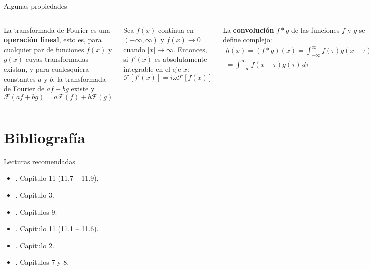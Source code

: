\documentclass[9pt, aspectratio=169]{beamer}
\begin{document}
\begin{frame}{Algunas propiedades}
\begin{columns}[c]
\cx
\begin{theorem}
    La transformada de Fourier es una \textbf{operación lineal}, esto es, para cualquier par de funciones $f(x)$ y $g(x)$ cuyas transformadas existan, y para cualesquiera constantes $a$ y $b$, la transformada de Fourier de $af + bg$ existe y
\begin{equation*}
    \mathscr{F}(a f + b g) = a \mathscr{F}(f) +  b \mathscr{F}(g)
\end{equation*}
\end{theorem} \pause

\begin{theorem}
Sea $f(x)$ continua en $(-\infty, \infty)$ y $f(x) \rightarrow 0$ cuando $|x| \rightarrow \infty$. Entonces, si $f'(x)$ es absolutamente integrable en el eje $x$:
\[ \mathscr{F}[ f'(x)] = i \omega \mathscr{F}[f(x)]  \]
\end{theorem}
\pause 

\cx
La \textbf{convolución} $f * g$ de las funciones $f$ y $g$ se define complejo:
\begin{multline*}
    h(x) = (f * g)(x) = \int_{-\infty}^{\infty} f(\tau) g(x - \tau) \, d\tau \\
= \int_{-\infty}^{\infty} f(x - \tau) g(\tau) \, d\tau 
\end{multline*}
\pause 

\begin{theorem}[Convolución]
Sean $f(x)$ y $g(x)$ funciones acotadas, continuas por tramos, y absolutamente integrables en $(-\infty, \infty)$, entonces
\[ \mathscr{F}(f * g) = \sqrt{2 \pi} \mathscr{F}(f) \mathscr{F}(g) \]
\end{theorem}

\end{columns}
\end{frame}


\section*{Bibliografía}
\begin{frame}{Lecturas recomendadas}
\begin{itemize}
 \item {}. Capítulo 11 (11.7 -- 11.9).
 \item {}. Capítulo 3.
 \item {}. Capítulos 9.
 \item {}. Capítulo 11 (11.1 -- 11.6).
 \item {}. Capítulo 2.
 \item {}. Capítulos 7 y 8.
\end{itemize}
\end{frame}
\end{document}

